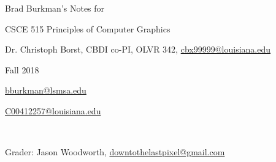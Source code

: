 \documentclass[12pt]{article}
\begin{document}
\setlength{\parindent}{0pt}
\begin{spacing}{1.2}

Brad Burkman's Notes for

\qquad CSCE 515 Principles of Computer Graphics

\qquad Dr. Christoph Borst, CBDI co-PI, 
OLVR 342, 
\url{cbx99999@louisiana.edu}

\qquad Fall 2018

\url{bburkman@lsmsa.edu}

\url{C00412257@louisiana.edu}

\

Grader:  Jason Woodworth, \url{downtothelastpixel@gmail.com}

\tableofcontents



















%
%

\end{spacing}
\end{document}

